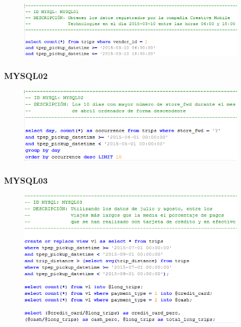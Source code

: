 \begin{figure}[h]
	\centering
	\includegraphics[width=1\textwidth]{Ilustraciones/MYSQL01.png}
\end{figure}

\subsubsection[]{MYSQL02}

\begin{figure}[h]
	\centering
	\includegraphics[width=1\textwidth]{Ilustraciones/MYSQL02.png}
\end{figure}

\clearpage

\subsubsection[]{MYSQL03}

\begin{figure}[h]
	\centering
	\includegraphics[width=1\textwidth]{Ilustraciones/MYSQL03.png}
\end{figure}

